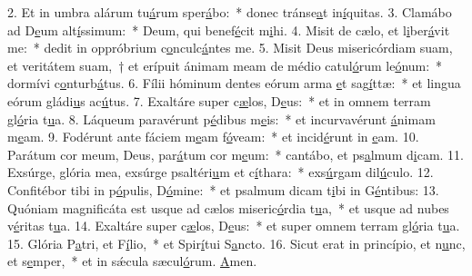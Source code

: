 2. Et in umbra alárum tu\uline{á}rum sper\uline{á}bo:~* donec tránse\uline{a}t in\uline{í}quitas.
3. Clamábo ad D\uline{e}um alt\uline{í}ssimum:~* Deum, qui benef\uline{é}cit m\uline{i}hi.
4. Misit de cælo, et l\uline{i}ber\uline{á}vit me:~* dedit in oppróbrium c\uline{o}nculc\uline{á}ntes me.
5. Misit Deus misericórdiam suam, et veritátem suam,~† et erípuit ánimam meam de médio catul\uline{ó}rum le\uline{ó}num:~* dormívi c\uline{o}nturb\uline{á}tus.
6. Fílii hóminum dentes eórum arma \uline{e}t sag\uline{í}ttæ:~* et lingua eórum gládi\uline{u}s ac\uline{ú}tus.
7. Exaltáre super c\uline{æ}los, D\uline{e}us:~* et in omnem terram gl\uline{ó}ria t\uline{u}a.
8. Láqueum paravérunt p\uline{é}dibus m\uline{e}is:~* et incurvavérunt \uline{á}nimam m\uline{e}am.
9. Fodérunt ante fáciem m\uline{e}am f\uline{ó}veam:~* et incid\uline{é}runt in \uline{e}am.
10. Parátum cor meum, Deus, par\uline{á}tum cor m\uline{e}um:~* cantábo, et ps\uline{a}lmum d\uline{i}cam.
11. Exsúrge, glória mea, exsúrge psaltéri\uline{u}m et c\uline{í}thara:~* exs\uline{ú}rgam dil\uline{ú}culo.
12. Confitébor tibi in p\uline{ó}pulis, D\uline{ó}mine:~* et psalmum dicam t\uline{i}bi in G\uline{é}ntibus:
13. Quóniam magnificáta est usque ad cælos miseric\uline{ó}rdia t\uline{u}a,~* et usque ad nubes v\uline{é}ritas t\uline{u}a.
14. Exaltáre super c\uline{æ}los, D\uline{e}us:~* et super omnem terram gl\uline{ó}ria t\uline{u}a.
15. Glória P\uline{a}tri, et F\uline{í}lio,~* et Spir\uline{í}tui S\uline{a}ncto.
16. Sicut erat in princípio, et n\uline{u}nc, et s\uline{e}mper,~* et in sǽcula sæcul\uline{ó}rum. \uline{A}men.
